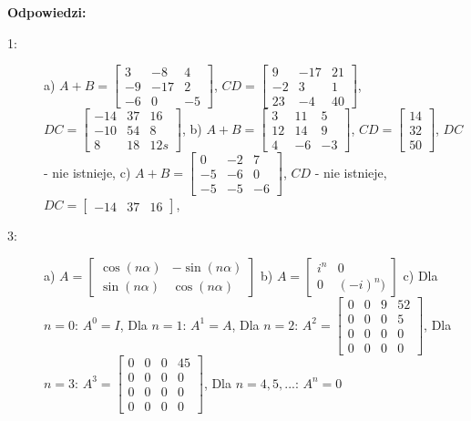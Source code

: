 \documentclass{article}
\begin{document}
\newpage
\textbf{Odpowiedzi:}
\begin{description}
    \item [1:] a) $A+B = \begin{bmatrix} 3 & -8 & 4\\  -9 & -17 & 2\\ -6 & 0 & -5 \end{bmatrix}$,
                  $CD = \begin{bmatrix} 9 & -17 & 21\\  -2 & 3 & 1\\ 23 & -4 & 40 \end{bmatrix}$,
                  $DC = \begin{bmatrix} -14 & 37 & 16\\  -10 & 54 & 8\\ 8 & 18 & 12s \end{bmatrix}$,
               b) $A+B = \begin{bmatrix} 3 & 11 & 5\\  12 & 14 & 9\\ 4 & -6 & -3 \end{bmatrix}$,
                  $CD = \begin{bmatrix} 14\\  32\\ 50 \end{bmatrix}$,
                  $DC$ - nie istnieje,
               c) $A+B = \begin{bmatrix} 0 & -2 & 7\\  -5 & -6 & 0\\ -5 & -5 & -6 \end{bmatrix}$,
                  $CD$ - nie istnieje,
                  $DC = \begin{bmatrix} -14 &  37 & 16 \end{bmatrix}$,
    \item [3:] a) $A = \begin{bmatrix} \cos(n\alpha) & -\sin(n\alpha)\\ \sin(n\alpha) & \cos(n\alpha) \end{bmatrix}$
               b) $A = \begin{bmatrix} i^{n} & 0\\ 0 & (-i)^{n}) \end{bmatrix}$
               c) Dla $n=0$: $A^{0} = I$, Dla $n=1$: $A^{1} = A$, Dla $n=2$: $A^{2} = \begin{bmatrix} 0 & 0 & 9 & 52\\ 0 & 0 & 0 & 5\\ 0 & 0 & 0 & 0\\ 0 & 0 & 0 & 0 \end{bmatrix}$, Dla $n=3$: $A^{3} = \begin{bmatrix} 0 & 0 & 0 & 45\\ 0 & 0 & 0 & 0\\ 0 & 0 & 0 & 0\\ 0 & 0 & 0 & 0 \end{bmatrix}$, Dla $n=4, 5, ...$: $A^{n} = 0$

\end{description}
\end{document}
